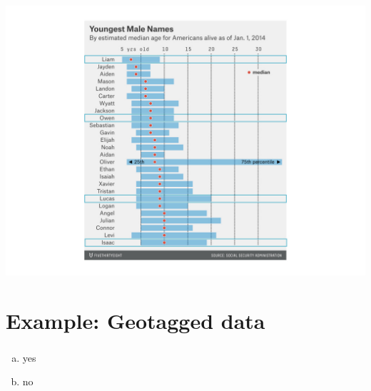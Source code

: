 \documentclass[11pt,containsverbatim,handout,xcolor=xelatex,dvipsnames,table]{beamer}
\begin{document}

\begin{frame}
\frametitle{}

\begin{center}
\includegraphics[width=\textwidth]{figures/youngnamesclass538_male}
\end{center}

\end{frame}


\section{Example: Geotagged data}


\begin{frame}
\frametitle{}


\begin{enumerate}[(a)]
\item yes
\item no
\end{enumerate}

\end{frame}

\end{document}
